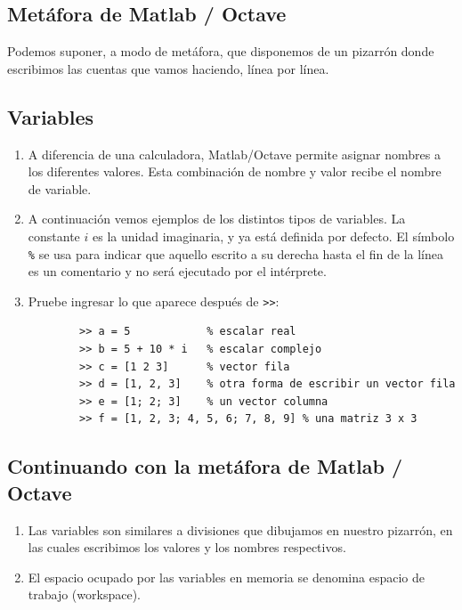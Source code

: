 \subsection{Metáfora de Matlab / Octave}

Podemos suponer, a modo de metáfora, que disponemos de un pizarrón donde escribimos las cuentas que vamos haciendo, línea por línea.

\subsection{Variables}

\begin{enumerate}
	
	\item A diferencia de una calculadora, Matlab/Octave permite asignar nombres a los diferentes valores. Esta combinación de nombre y valor recibe el nombre de variable.
	
	\item A continuación vemos ejemplos de los distintos tipos de variables. La constante $i$ es la unidad imaginaria, y ya está definida por defecto. El símbolo \texttt{\%} se usa para indicar que aquello escrito a su derecha hasta el fin de la línea es un comentario y no será ejecutado por el intérprete.
	
	\item Pruebe ingresar lo que aparece después de \verb->>-:
	\begin{verbatim}
		>> a = 5            % escalar real
		>> b = 5 + 10 * i   % escalar complejo
		>> c = [1 2 3]      % vector fila
		>> d = [1, 2, 3]    % otra forma de escribir un vector fila
		>> e = [1; 2; 3]    % un vector columna
		>> f = [1, 2, 3; 4, 5, 6; 7, 8, 9] % una matriz 3 x 3
	\end{verbatim}
\end{enumerate}

\subsection{Continuando con la metáfora de Matlab / Octave}

\begin{enumerate}
	\item Las variables son similares a divisiones que dibujamos en nuestro pizarrón, en las cuales escribimos los valores y los nombres respectivos.
	\item El espacio ocupado por las variables en memoria se denomina espacio de trabajo (workspace).
\end{enumerate}

